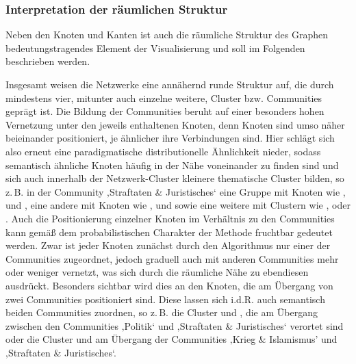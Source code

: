 \subsubsection{Interpretation der räumlichen Struktur}\label{interpretation-der-raeumlichen-struktur}

Neben den Knoten und Kanten ist auch die räumliche Struktur des Graphen bedeutungstragendes Element der Visualisierung und soll im Folgenden beschrieben werden.

Insgesamt weisen die Netzwerke eine annähernd runde Struktur auf, die durch mindestens vier, mitunter auch einzelne weitere, Cluster bzw. Communities geprägt ist. Die Bildung der Communities beruht auf einer besonders hohen Vernetzung unter den jeweils enthaltenen Knoten, denn Knoten sind umso näher beieinander positioniert, je ähnlicher ihre Verbindungen sind. Hier schlägt sich also erneut eine paradigmatische distributionelle Ähnlichkeit nieder, sodass semantisch ähnliche Knoten häufig in der Nähe voneinander zu finden sind und sich auch innerhalb der Netzwerk-Cluster kleinere thematische Cluster bilden, so z.\,B. in der Community ‚Straftaten \& Juristisches` eine Gruppe mit Knoten wie ,  und , eine andere mit Knoten wie ,  und  sowie eine weitere mit Clustern wie ,  oder . Auch die Positionierung einzelner Knoten im Verhältnis zu den Communities kann gemäß dem probabilistischen Charakter der Methode fruchtbar gedeutet werden. Zwar ist jeder Knoten zunächst durch den Algorithmus nur einer der Communities zugeordnet, jedoch graduell auch mit anderen Communities mehr oder weniger vernetzt, was sich durch die räumliche Nähe zu ebendiesen ausdrückt. Besonders sichtbar wird dies an den Knoten, die am Übergang von zwei Communities positioniert sind. Diese lassen sich i.d.R. auch semantisch beiden Communities zuordnen, so z.\,B. die Cluster  und , die am Übergang zwischen den Communities ‚Politik` und ‚Straftaten \& Juristisches` verortet sind oder die Cluster  und  am Übergang der Communities ‚Krieg \& Islamismus' und ‚Straftaten \& Juristisches`.

